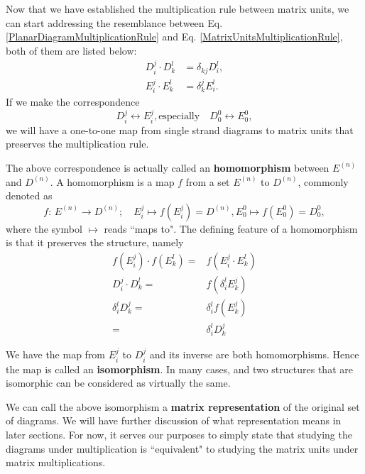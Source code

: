 \documentclass[10pt,a4paper]{article}
\newcommand{\DD}[2]{\boxed{D_{#1}^{#2}}}
\begin{document}
	Now that we have established the multiplication rule between matrix units, we can start addressing the resemblance between Eq. \eqref{PlanarDiagramMultiplicationRule} and Eq. \eqref{MatrixUnitsMultiplicationRule}, both of them are listed below:
	\begin{align*}
	\DD ij\cdot \DD kl & =\delta_{kj} \DD il,\\
	E_i^j \cdot E_k^l &= \delta^j_k E_i^l.
	\end{align*}
	If we make the correspondence 
	\begin{equation}
	\DD ij \leftrightarrow E_i^j, \text{especially}\quad \DD 00 \leftrightarrow E_0^0,
	\end{equation}
	we will have a one-to-one map from single strand diagrams to matrix units that preserves the multiplication rule. 
	
	The above correspondence is actually called an \textbf{homomorphism} between $E^{(n)}$ and $D^{(n)}$. A homomorphism is a map $f$ from a set $E^{(n)}$ to $D^{(n)}$, commonly denoted as 
	\begin{equation}
	f: \, E^{(n)} \rightarrow D^{(n)}; \quad E_i^j \mapsto f(E_i^j) = D^{(n)}, E_0^0 \mapsto f(E_0^0)= \DD 00,
	\end{equation}
	where the symbol $\mapsto$ reads ``maps to". The defining feature of a homomorphism is that it preserves the structure, namely 
	\begin{equation}
	\begin{aligned}
	f(E_i^j)\cdot f(E_k^l) =& f(E_i^j \cdot E_k^l)\\
	\DD ij \cdot \DD kl =& f(\delta_i^l  E_k^j)\\
	\delta_i^l \DD kj =& \delta_i^l f(E_k^j) \\
	=&\delta_i^l \DD kj 
	\end{aligned}
	\end{equation}
	
	We have the map from $E_i^j$ to $\DD ij$ and its inverse are both homomorphisms. Hence the map is called an \textbf{isomorphism}. In many cases, and two structures that are isomorphic can be considered as virtually the same. 	
	
	We can call the above isomorphism a \textbf{matrix representation} of the original set of diagrams. We will have further discussion of what representation means in later sections. For now, it serves our purposes to simply state that studying the diagrams under multiplication is ``equivalent" to studying the matrix units under matrix multiplications.
	
\end{document}
